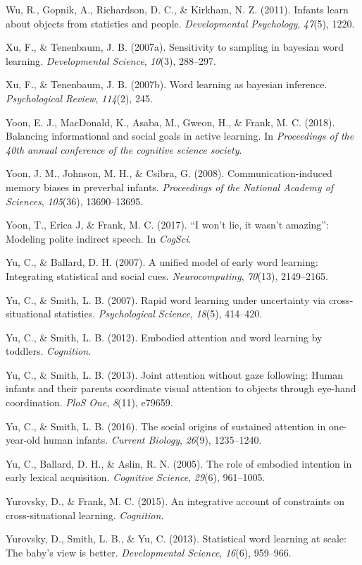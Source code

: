 \documentclass[oneside]{report}
\begin{document}
\hypertarget{ref-wu2011infants}{}
Wu, R., Gopnik, A., Richardson, D. C., \& Kirkham, N. Z. (2011). Infants
learn about objects from statistics and people. \emph{Developmental
Psychology}, \emph{47}(5), 1220.

\hypertarget{ref-xu2007sampling}{}
Xu, F., \& Tenenbaum, J. B. (2007a). Sensitivity to sampling in bayesian
word learning. \emph{Developmental Science}, \emph{10}(3), 288--297.

\hypertarget{ref-xu2007word}{}
Xu, F., \& Tenenbaum, J. B. (2007b). Word learning as bayesian
inference. \emph{Psychological Review}, \emph{114}(2), 245.

\hypertarget{ref-yoon2018balancing}{}
Yoon, E. J., MacDonald, K., Asaba, M., Gweon, H., \& Frank, M. C.
(2018). Balancing informational and social goals in active learning. In
\emph{Proceedings of the 40th annual conference of the cognitive science
society}.

\hypertarget{ref-yoon2008communication}{}
Yoon, J. M., Johnson, M. H., \& Csibra, G. (2008). Communication-induced
memory biases in preverbal infants. \emph{Proceedings of the National
Academy of Sciences}, \emph{105}(36), 13690--13695.

\hypertarget{ref-yoonwon}{}
Yoon, T., Erica J, \& Frank, M. C. (2017). ``I won't lie, it wasn't
amazing'': Modeling polite indirect speech. In \emph{CogSci}.

\hypertarget{ref-yu2007unified}{}
Yu, C., \& Ballard, D. H. (2007). A unified model of early word
learning: Integrating statistical and social cues.
\emph{Neurocomputing}, \emph{70}(13), 2149--2165.

\hypertarget{ref-yu2007rapid}{}
Yu, C., \& Smith, L. B. (2007). Rapid word learning under uncertainty
via cross-situational statistics. \emph{Psychological Science},
\emph{18}(5), 414--420.

\hypertarget{ref-yu2012embodied}{}
Yu, C., \& Smith, L. B. (2012). Embodied attention and word learning by
toddlers. \emph{Cognition}.

\hypertarget{ref-yu2013joint}{}
Yu, C., \& Smith, L. B. (2013). Joint attention without gaze following:
Human infants and their parents coordinate visual attention to objects
through eye-hand coordination. \emph{PloS One}, \emph{8}(11), e79659.

\hypertarget{ref-yu2016social}{}
Yu, C., \& Smith, L. B. (2016). The social origins of sustained
attention in one-year-old human infants. \emph{Current Biology},
\emph{26}(9), 1235--1240.

\hypertarget{ref-yu2005role}{}
Yu, C., Ballard, D. H., \& Aslin, R. N. (2005). The role of embodied
intention in early lexical acquisition. \emph{Cognitive Science},
\emph{29}(6), 961--1005.

\hypertarget{ref-yurovsky2014algorithmic}{}
Yurovsky, D., \& Frank, M. C. (2015). An integrative account of
constraints on cross-situational learning. \emph{Cognition}.

\hypertarget{ref-yurovsky2013statistical}{}
Yurovsky, D., Smith, L. B., \& Yu, C. (2013). Statistical word learning
at scale: The baby's view is better. \emph{Developmental Science},
\emph{16}(6), 959--966.


\end{document}
